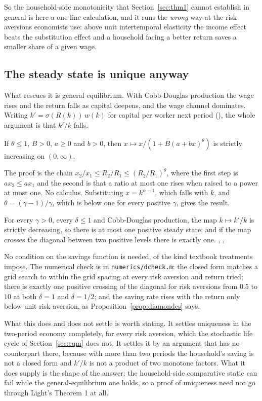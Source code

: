 So the household-side monotonicity that Section~\ref{sec:thm1} cannot establish in general is
here a one-line calculation, and it runs the \emph{wrong} way at the risk aversions economists
use: above unit intertemporal elasticity the income effect beats the substitution effect and a
household facing a better return saves a smaller share of a given wage.

\subsection{The steady state is unique anyway}

What rescues it is general equilibrium. With Cobb-Douglas production the wage rises and the return
falls as capital deepens, and the wage channel dominates. Writing $k'=\sigma(R(k))\,w(k)$ for
capital per worker next period (), the whole argument is that $k'/k$ falls.

\begin{proposition}\label{prop:engine}
If $\theta\le1$, $B>0$, $a\ge0$ and $b>0$, then $x\mapsto x/(1+B(a+bx)^\theta)$ is strictly
increasing on $(0,\infty)$.
\end{proposition}

The proof is the chain $x_2/x_1\le R_2/R_1\le(R_2/R_1)^\theta$, where the first step is
$ax_2\le ax_1$ and the second is that a ratio at most one rises when raised to a power at most one.
No calculus. Substituting $x=k^{\alpha-1}$, which falls with $k$, and $\theta=(\gamma-1)/\gamma$,
which is below one for every positive $\gamma$, gives the result.

\begin{theorem}\label{thm:diamond}
For every $\gamma>0$, every $\delta\le1$ and Cobb-Douglas production, the map $k\mapsto k'/k$ is
strictly decreasing, so there is at most one positive steady state; and if the map crosses the
diagonal between two positive levels there is exactly one.
, , 
\end{theorem}

No condition on the savings function is needed, of the kind textbook treatments impose. The
numerical check is in \texttt{numerics/dcheck.m}: the closed form matches a grid search to within
the grid spacing at every risk aversion and return tried; there is exactly one positive crossing
of the diagonal for risk aversions from $0.5$ to $10$ at both $\delta=1$ and $\delta=1/2$; and the
saving rate rises with the return only below unit risk aversion, as
Proposition~\ref{prop:diamondcs} says.

What this does and does not settle is worth stating. It settles uniqueness in the two-period
economy completely, for every risk aversion, which the stochastic life cycle of
Section~\ref{sec:eqm} does not. It settles it by an argument that has no counterpart there,
because with more than two periods the household's saving is not a closed form and $k'/k$ is not a
product of two monotone factors. What it does supply is the shape of the answer: the
household-side comparative static can fail while the general-equilibrium one holds, so a proof of
uniqueness need not go through Light's Theorem 1 at all.
